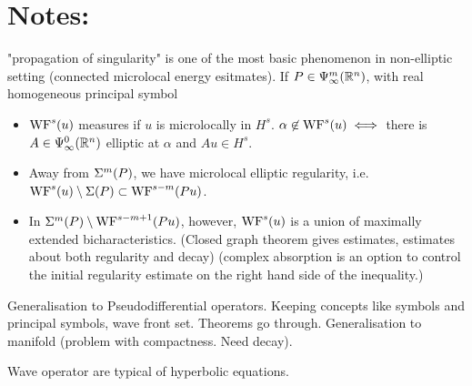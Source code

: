 \documentclass{article}
\begin{document}
\section{Notes:}
"propagation of singularity" is one of the most basic phenomenon in non-elliptic setting (connected microlocal energy esitmates). If $P \in \Psi^{m}_{\infty}({\mathbb R}^n)$, with real homogeneous principal symbol
\begin{itemize}
    \item $\mathrm{WF}^s(u)$ measures if $u$ is microlocally in $H^s$. $\alpha \not \in \mathrm{WF}^s(u) \iff $ there is $A \in \Psi^{0}_{\infty}({\mathbb R}^n)$ elliptic at $\alpha$ and $Au \in H^s$. 
    \item Away from $\Sigma^m(P)$, we have microlocal elliptic regularity, i.e. $\mathrm{WF}^s(u) \setminus \Sigma(P) \subset \mathrm{WF}^{s - m}(Pu)$. 
    \item In $\Sigma^m(P) \setminus \mathrm{WF}^{s - m + 1}(Pu)$, however, $\mathrm{WF}^s(u)$ is a union of maximally extended bicharacteristics. (Closed graph theorem gives estimates, estimates about both regularity and decay) (complex absorption is an option to control the initial regularity estimate on the right hand side of the inequality.)
\end{itemize}


Generalisation to Pseudodifferential operators. Keeping concepts like symbols and principal symbols, wave front set. Theorems go through. Generalisation to manifold (problem with compactness. Need decay). 

Wave operator are typical of hyperbolic equations. 
\end{document}
